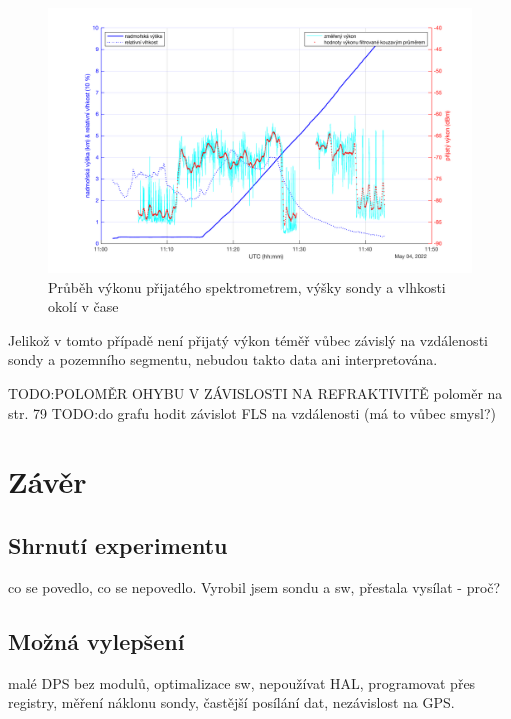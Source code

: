 \documentclass[twoside]{ctuthesis}
\theoremstyle{plain}
\theoremstyle{definition}
\theoremstyle{note}
\begin{document}
	\begin{figure}[hbtp]
		\centering
		\includegraphics[width=.9\textwidth]{Graphs/alt_hum_p_p_filt.pdf}
		\caption{Průběh výkonu přijatého spektrometrem, výšky sondy a vlhkosti okolí v čase}
		\label{grah:p:alt:hum}
	\end{figure}

	Jelikož v tomto případě není přijatý výkon téměř vůbec závislý na vzdálenosti sondy a pozemního segmentu, nebudou takto data ani interpretována. 

	TODO:POLOMĚR OHYBU V ZÁVISLOSTI NA REFRAKTIVITĚ poloměr na str. 79
	TODO:do grafu hodit závislot FLS na vzdálenosti (má to vůbec smysl?)

















	


\chapter{Závěr}
	\section{Shrnutí experimentu}
	co se povedlo, co se nepovedlo. Vyrobil jsem sondu a sw, přestala vysílat - proč? 

	\section{Možná vylepšení}
	malé DPS bez modulů, optimalizace sw, nepoužívat HAL, programovat přes registry, měření náklonu sondy, častější posílání dat, nezávislost na GPS.
\end{document}
